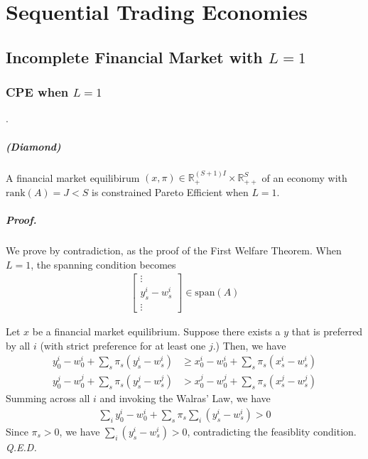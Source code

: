 \chapter{Sequential Trading Economies}

\section{Incomplete Financial Market with $L = 1$}
\subsection{CPE when $L = 1$}.
\paragraph{(Diamond)} 
A financial market equilibirum $(x, \pi) \in \mathbb{R}^{(S+1)I}_{+} \times \mathbb{R}_{++}^S$
of an economy with $\text{rank}(A) =  J < S$
is constrained Pareto Efficient when $L= 1$.

\paragraph{Proof.} We prove by contradiction, as the proof of the First Welfare Theorem. 
When $L=1$, the spanning condition becomes 
\begin{align*}
    \begin{bmatrix}
        \vdots \\ 
        y^i_s - w^i_s \\
        \vdots
    \end{bmatrix} \in \text{span}(A)
\end{align*}

Let $x$ be a financial market equilibrium. 
Suppose there exists a $y$ that is preferred by all $i$ (with strict preference for at least one $j$.)
Then, we have 
\begin{align*}
    y^i_0 - w^i_0 + \sum_s \pi_s (y^i_s - w^i_s) & \geq x^i_0 - w^i_0 + \sum_s \pi_s (x^i_s - w^i_s) \\ 
    y^j_0 - w^j_0 + \sum_s \pi_s (y^j_s - w^j_s) & > x^j_0 - w^j_0 + \sum_s \pi_s (x^j_s - w^j_s)
\end{align*}
Summing across all $i$ and invoking the Walras' Law, we have
\begin{align*}
    \sum_i y^i_0 - w^i_0 + \sum_s \pi_s  \sum_i (y^i_s - w^i_s) > 0 
\end{align*}
Since $\pi_s  > 0$, we have $\sum_i (y^i_s - w^i_s) > 0 $, contradicting the feasiblity condition. 
\\
\textit{Q.E.D.}


